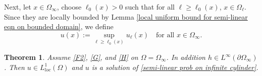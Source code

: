 \documentclass{amsart}
\newtheorem{theorem}{Theorem}[section]
\newcommand{\ul}{u_{\ell}}
\begin{document}
Next, let $x\in \Omega_{\infty}$, choose $\ell_{0}(x)>0$ such that for all $\ell\geq\ell_{0}(x)$, $x\in \Omega_{\ell}$. Since they are locally bounded by Lemma \ref{local uniform bound for semi-linear eqn on bounded domain}, we define
 \begin{equation*}
     u(x):=\sup_{\ell\geq\ell_{0}(x)}\ul(x) \quad \text{for all }x\in \Omega_{\infty}.
 \end{equation*}
 \begin{theorem}
     Assume \ref{F2}, \ref{G}, and \ref{H} on $\Omega=\Omega_{\infty}$. In addition $h\in  L^{\infty}(\partial\Omega_{\infty})$ %
     . Then $u\in L_{loc}^{1}(\Omega)$ and $u$ is a solution of \eqref{semi-linear prob on infinite cylinder}.
 \end{theorem}
\end{document}
